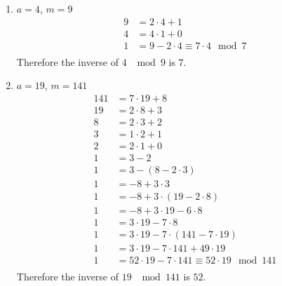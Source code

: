 \documentclass[openany]{report}
\begin{document}
\begin{enumerate}[label=(\alph*)]
    \item $a=4$, $m=9$
    \begin{align*}
        9 &= 2 \cdot 4 + 1 \\
        4 &= 4 \cdot 1 + 0\\
        1 &= 9 - 2 \cdot 4 \equiv 7 \cdot 4 \mod 7\\
    \end{align*}
    Therefore the inverse of $4$ $\mod 9$ is $7$.
    \item $a=19$, $m=141$
    \begin{align*}
        141 &= 7 \cdot 19 + 8 \\
        19 &= 2 \cdot 8 + 3\\
        8 &= 2 \cdot 3 + 2\\
        3 &= 1 \cdot 2 + 1\\
        2 &= 2 \cdot 1 + 0\\
        1 &= 3 - 2\\ 
        1 &= 3 - (8 - 2 \cdot 3)\\
        1 &= -8 + 3 \cdot 3\\
        1 &= -8 + 3 \cdot (19 - 2\cdot 8)\\
        1 &= -8 + 3 \cdot 19 - 6 \cdot 8\\
        1 &= 3 \cdot 19 - 7 \cdot 8\\
        1 &= 3 \cdot 19 - 7 \cdot (141 - 7 \cdot 19)\\
        1 &= 3 \cdot 19 - 7 \cdot 141 + 49 \cdot 19\\
        1 &= 52 \cdot 19 - 7 \cdot 141 \equiv 52 \cdot 19 \mod 141\\
    \end{align*}
    Therefore the inverse of $19$ $\mod 141$ is $52$.
\end{enumerate}
\end{document}
